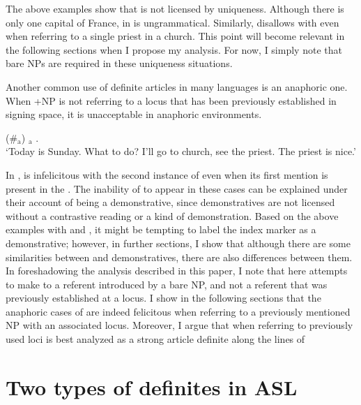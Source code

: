 \documentclass[output=paper,
modfonts
]{langscibook}
\begin{document}
The above examples show that  is not licensed by uniqueness. Although there is only one capital of France,  in  is ungrammatical. Similarly,  disallows  with  even when referring to a single priest in a church. This point will become relevant in the following sections when I propose my analysis. For now, I simply note that bare NPs are required in these uniqueness situations. 

Another common use of definite articles in many languages is an anaphoric one. When +NP is not referring to a locus that has been previously established in signing space, it is unacceptable in anaphoric environments. 

\begin{exe} 
\ex \label{ex:irani:6}  (\#$_\text{a}$) $_\text{a}$ . \\
`Today is Sunday. What to do? I’ll go to church, see the priest. The priest is nice.’ \citep[234]{KoulidobrovaLilloMartin2016}
\end{exe}

In ,  is infelicitous with the second instance of  even when its first mention is present in the . The inability of  to appear in these cases can be explained under their account of  being a demonstrative, since demonstratives are not licensed without a contrastive reading or a kind of demonstration. Based on the above examples with  and , it might be tempting to label the index marker as a demonstrative; however, in further sections, I show that although there are some similarities between  and demonstratives, there are also differences between them. In foreshadowing the analysis described in this paper, I note that  here attempts to make  to a referent introduced by a bare NP, and not a referent that was previously established at a locus. I show in the following sections that the anaphoric cases of  are indeed felicitous when referring to a previously mentioned NP with an associated locus. Moreover, I argue that  when referring to previously used loci is best analyzed as a strong article definite along the lines of \citet{Schwarz2009,Schwarz2013}

\section{Two types of definites in ASL}\label{sec:irani:3} 
\end{document}
